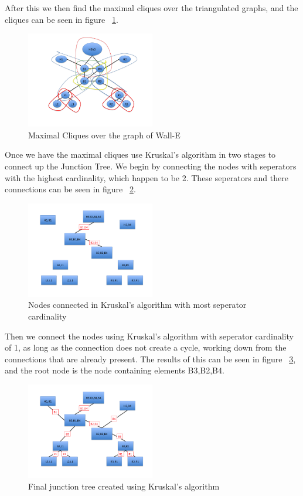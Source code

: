 \documentclass[paper=a4, fontsize=11pt]{scrartcl} %
\begin{document}
After this we then find the maximal cliques over the triangulated graphs, and the cliques can be seen in figure ~\ref{fig:clique}.

\begin{figure}
\centering
\includegraphics[width=0.5\textwidth]{Problem3/Slide3.png}
\caption{Maximal Cliques over the graph of Wall-E}
\label{fig:clique}
\end{figure}

Once we have the maximal cliques use Kruskal's algorithm in two stages to connect up the Junction Tree.  
We begin by connecting the nodes with seperators with the highest cardinality, which happen to be 2.
These seperators and there connections can be seen in figure ~\ref{fig:ver1}.

\begin{figure}
\centering
\includegraphics[width=0.5\textwidth]{Problem3/Slide4.png}
\caption{Nodes connected in Kruskal's algorithm with most seperator cardinality}
\label{fig:ver1}
\end{figure}

Then we connect the nodes using Kruskal's algorithm with seperator cardinality of 1, as long as the connection does not create a cycle, working down from the connections that are already present. 
The results of this can be seen in figure ~\ref{fig:ver2}, and the root node is the node containing elements B3,B2,B4.

\begin{figure}
\centering
\includegraphics[width=0.5\textwidth]{Problem3/Slide5.png}
\caption{Final junction tree created using Kruskal's algorithm}
\label{fig:ver2}
\end{figure}
\end{document}
